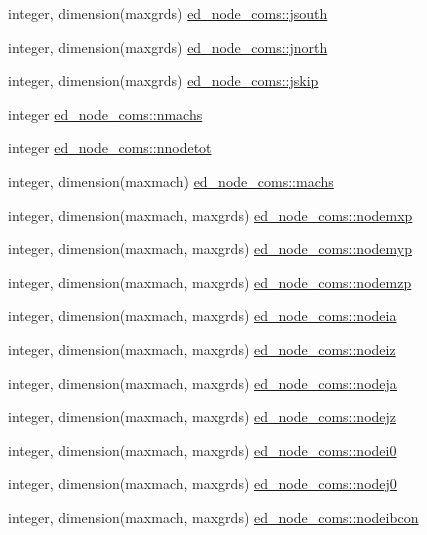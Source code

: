 \begin{DoxyCompactItemize}
\item 
integer, dimension(maxgrds) \hyperlink{namespaceed__node__coms_a1c7e45eb29343f70f7789155ffb43673}{ed\+\_\+node\+\_\+coms\+::jsouth}
\item 
integer, dimension(maxgrds) \hyperlink{namespaceed__node__coms_afd254e42e760f8e20809b89c6862f940}{ed\+\_\+node\+\_\+coms\+::jnorth}
\item 
integer, dimension(maxgrds) \hyperlink{namespaceed__node__coms_a9427f37c650ec53e118b58d7e64e5aee}{ed\+\_\+node\+\_\+coms\+::jskip}
\item 
integer \hyperlink{namespaceed__node__coms_a9427aedda304b49d26b906085ca6afec}{ed\+\_\+node\+\_\+coms\+::nmachs}
\item 
integer \hyperlink{namespaceed__node__coms_a5c636bae6669416499eb51f9ac0e8ca2}{ed\+\_\+node\+\_\+coms\+::nnodetot}
\item 
integer, dimension(maxmach) \hyperlink{namespaceed__node__coms_ad169e35de47cf7f3b0f522cec093e003}{ed\+\_\+node\+\_\+coms\+::machs}
\item 
integer, dimension(maxmach, maxgrds) \hyperlink{namespaceed__node__coms_a5fdf4fa217cc15fdab945bf67190a545}{ed\+\_\+node\+\_\+coms\+::nodemxp}
\item 
integer, dimension(maxmach, maxgrds) \hyperlink{namespaceed__node__coms_ad31a7ed8c12f8db5df56c78b9682dc23}{ed\+\_\+node\+\_\+coms\+::nodemyp}
\item 
integer, dimension(maxmach, maxgrds) \hyperlink{namespaceed__node__coms_aa2430afe20235a8503a91fe9824f1d6b}{ed\+\_\+node\+\_\+coms\+::nodemzp}
\item 
integer, dimension(maxmach, maxgrds) \hyperlink{namespaceed__node__coms_a829855ba74deed2626857b865e7408da}{ed\+\_\+node\+\_\+coms\+::nodeia}
\item 
integer, dimension(maxmach, maxgrds) \hyperlink{namespaceed__node__coms_ac7587c43282c2cc903564724b117098b}{ed\+\_\+node\+\_\+coms\+::nodeiz}
\item 
integer, dimension(maxmach, maxgrds) \hyperlink{namespaceed__node__coms_a116c403afd361d69151547dc435f4fbb}{ed\+\_\+node\+\_\+coms\+::nodeja}
\item 
integer, dimension(maxmach, maxgrds) \hyperlink{namespaceed__node__coms_ae1f44d8dd2031c7740623b475928d5f2}{ed\+\_\+node\+\_\+coms\+::nodejz}
\item 
integer, dimension(maxmach, maxgrds) \hyperlink{namespaceed__node__coms_a1c7fca6c0b4e16a6c824966437383262}{ed\+\_\+node\+\_\+coms\+::nodei0}
\item 
integer, dimension(maxmach, maxgrds) \hyperlink{namespaceed__node__coms_a8cb55126a161c5cf71f938898292cf77}{ed\+\_\+node\+\_\+coms\+::nodej0}
\item 
integer, dimension(maxmach, maxgrds) \hyperlink{namespaceed__node__coms_acbb4bfd87dc840f6823b6a5ae9753040}{ed\+\_\+node\+\_\+coms\+::nodeibcon}
\end{DoxyCompactItemize}
